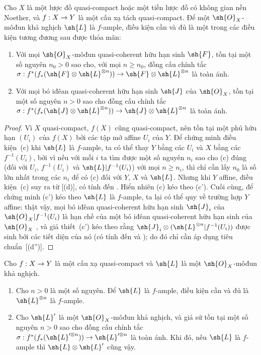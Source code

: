 \documentclass[oneside,10pt]{amsart}
\makeatletter
\renewcommand{\geq}{\geqslant}
\newcommand{\ega@arrow}[2]{\mathchoice{#1}{#2}{#2}{#2}}
\renewcommand{\to}{\ega@arrow{\longrightarrow}{\rightarrow}}
\newcommand{\oldpage}[2][]{\marginnote{\normalfont\footnotesize\textbf{#1}~|~#2}\ignorespaces}
\let\EGAOriginalLabel\label
\renewcommand{\label}[1]{\phantomsection\EGAOriginalLabel{#1}}
\makeatother
\begin{document}
\begin{proposition}[4.6.8]
\label{II.4.6.8}
Cho $X$ là một lược đồ quasi-compact hoặc một tiền lược đồ có không gian nền Noether, và $f:X\to Y$ là một cấu xạ tách quasi-compact.
Để một $\sh{O}_X$-môđun khả nghịch $\sh{L}$ là $f$-ample, điều kiện cần và đủ là một trong các điều kiện tương đương sau được thỏa mãn:
\begin{enumerate}
  \item[\rm{(c)}] Với mọi $\sh{O}_X$-môđun quasi-coherent hữu hạn sinh $\sh{F}$, tồn tại một số nguyên $n_0>0$ sao cho, với mọi $n\geq n_0$, đồng cấu chính tắc $\sigma:f^*(f_*(\sh{F}\otimes\sh{L}^{\otimes n}))\to\sh{F}\otimes\sh{L}^{\otimes n}$ là toàn ánh.
  \item[\rm{(c')}] Với mọi bó iđêan quasi-coherent hữu hạn sinh $\sh{J}$ của $\sh{O}_X$, tồn tại một số nguyên $n>0$ sao cho đồng cấu chính tắc $\sigma:f^*(f_*(\sh{J}\otimes\sh{L}^{\otimes n}))\to\sh{J}\otimes\sh{L}^{\otimes n}$ là toàn ánh.
\end{enumerate}
\end{proposition}

\begin{proof}
Vì $X$ quasi-compact, $f(X)$ cũng quasi-compact, nên tồn tại một phủ hữu hạn $(U_i)$ của $f(X)$ bởi các tập mở affine $U_i$ của $Y$.
Để chứng minh điều kiện~(c) khi $\sh{L}$ là $f$-ample, ta có thể thay $Y$ bằng các $U_i$ và $X$ bằng các $f^{-1}(U_i)$, bởi vì nếu với mỗi $i$ ta tìm được một số nguyên $n_i$ sao cho (c) đúng (đối với $U_i$, $f^{-1}(U_i)$ và $\sh{L}|f^{-1}(U_i)$) với mọi $n\geq n_i$, thì chỉ cần lấy $n_0$ là số lớn nhất trong các $n_i$ để có (c) đối với $Y$, $X$ và $\sh{L}$.
Nhưng khi $Y$ affine, điều kiện~(c) suy ra từ [(d)], có tính đến .
Hiển nhiên (c) kéo theo (c').
Cuối cùng, để chứng minh (c') kéo theo $\sh{L}$ là $f$-ample, ta lại có thể quy về trường hợp $Y$ affine:
thật vậy, mọi bó iđêan quasi-coherent hữu hạn sinh $\sh{J}_i$ của $\sh{O}_X|f^{-1}(U_i)$ là hạn chế của một bó iđêan quasi-coherent hữu hạn sinh của $\sh{O}_X$ , và giả thiết~(c') kéo theo rằng
\oldpage[II]{91}
$\sh{J}_i\otimes(\sh{L}^{\otimes n}|f^{-1}(U_i))$ được sinh bởi các tiết diện của nó (có tính đến  và );
do đó chỉ cần áp dụng tiêu chuẩn~[(d'')].
\end{proof}

\begin{proposition}[4.6.9]
\label{II.4.6.9}
Cho $f:X\to Y$ là một cấu xạ quasi-compact và $\sh{L}$ là một $\sh{O}_X$-môđun khả nghịch.
\begin{enumerate}
  \item[\rm{(i)}] Cho $n>0$ là một số nguyên.
    Để $\sh{L}$ là $f$-ample, điều kiện cần và đủ là $\sh{L}^{\otimes n}$ là $f$-ample.
  \item[\rm{(ii)}] Cho $\sh{L}'$ là một $\sh{O}_X$-môđun khả nghịch, và giả sử tồn tại một số nguyên $n>0$ sao cho đồng cấu chính tắc $\sigma:f^*(f_*(\sh{L}'^{\otimes n}))\to\sh{L}'^{\otimes n}$ là toàn ánh.
    Khi đó, nếu $\sh{L}$ là $f$-ample thì $\sh{L}\otimes\sh{L}'$ cũng vậy.
\end{enumerate}
\end{proposition}
\end{document}

